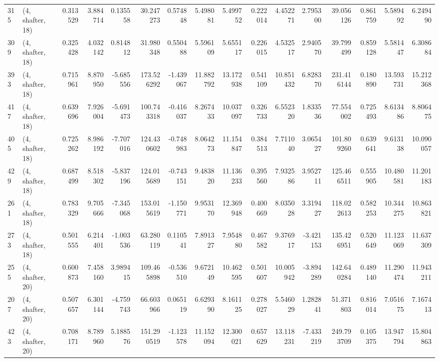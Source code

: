 \begin{tabular}{llrrrrrrrrrrrrrr}
315 &  (4, shafter, 18) &   0.313529 &   3.884714 &   0.135558 &    30.247273 &   0.574848 &   5.498081 &   5.499752 &  0.222014 &   4.452271 &   2.795300 &    39.056126 &  0.861759 &   5.589492 &   6.249490 \\
309 &  (4, shafter, 18) &   0.325428 &   4.032142 &   0.814812 &    31.980348 &   0.550488 &   5.596109 &   5.655117 &  0.226015 &   4.532517 &   2.940570 &    39.799499 &  0.859128 &   5.581447 &   6.308684 \\
393 &  (4, shafter, 18) &   0.715961 &   8.870950 &  -5.685556 &   173.526292 &  -1.439067 &  11.882792 &  13.172938 &  0.541109 &  10.851432 &   6.828370 &   231.416144 &  0.180890 &  13.593731 &  15.212368 \\
417 &  (4, shafter, 18) &   0.639696 &   7.926004 &  -5.691473 &   100.743318 &  -0.416037 &   8.267433 &  10.037097 &  0.326733 &   6.552320 &   1.833536 &    77.554002 &  0.725493 &   8.613486 &   8.806475 \\
405 &  (4, shafter, 18) &   0.725262 &   8.986192 &  -7.707016 &   124.430602 &  -0.748983 &   8.064273 &  11.154847 &  0.384513 &   7.711040 &   3.065427 &   101.809260 &  0.639641 &   9.613138 &  10.090057 \\
429 &  (4, shafter, 18) &   0.687499 &   8.518302 &  -5.837196 &   124.015689 &  -0.743151 &   9.483820 &  11.136233 &  0.395560 &   7.932586 &   3.952711 &   125.466511 &  0.555905 &  10.480581 &  11.201183 \\
261 &  (4, shafter, 18) &   0.783329 &   9.705666 &  -7.345068 &   153.015619 &  -1.150771 &   9.953170 &  12.369948 &  0.400669 &   8.035028 &   3.319427 &   118.022613 &  0.582253 &  10.344275 &  10.863821 \\
273 &  (4, shafter, 18) &   0.501555 &   6.214401 &  -1.003536 &    63.280119 &   0.110541 &   7.891327 &   7.954880 &  0.467582 &   9.376917 &  -3.421153 &   135.426951 &  0.520649 &  11.123069 &  11.637309 \\
255 &  (4, shafter, 20) &   0.600873 &   7.458160 &   3.989415 &   109.465898 &  -0.536510 &   9.672149 &  10.462595 &  0.501607 &  10.005942 &  -3.894289 &   142.640284 &  0.489140 &  11.290474 &  11.943211 \\
207 &  (4, shafter, 20) &   0.507657 &   6.301144 &  -4.759743 &    66.603966 &   0.065119 &   6.629390 &   8.161125 &  0.278027 &   5.546029 &   1.282841 &    51.371803 &  0.816014 &   7.051675 &   7.167413 \\
423 &  (4, shafter, 20) &   0.708171 &   8.789960 &   5.188576 &   151.290519 &  -1.123578 &  11.152094 &  12.300021 &  0.657629 &  13.118231 &  -7.433219 &   249.793709 &  0.105375 &  13.947794 &  15.804863 \\

\end{tabular}
